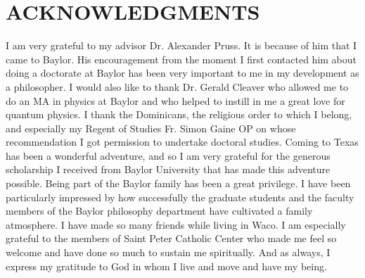 \documentclass[12pt]{report}
\begin{document}

\chapter*{ACKNOWLEDGMENTS} %



I am very grateful to my advisor Dr. Alexander Pruss. It is because of him that I came to Baylor. His encouragement from the moment I first contacted him about doing a doctorate at Baylor has been very important to me in my development as a philosopher. I would also like to thank Dr. Gerald Cleaver who allowed me to do an MA in physics at Baylor and who helped to instill in me a great love for quantum physics. I thank the Dominicans, the religious order to which I belong, and especially my Regent of Studies Fr. Simon Gaine OP on whose recommendation I got permission to undertake doctoral studies. Coming to Texas has been a wonderful adventure, and so I am very grateful for the generous scholarship I received from Baylor University that has made this adventure possible. Being part of the Baylor family has been a great privilege. I have been particularly impressed by how successfully the graduate students and the faculty members of the Baylor philosophy department have cultivated a family atmosphere. I have made so many friends while living in Waco. I am especially grateful to the members of Saint Peter Catholic Center who made me feel so welcome and have done so much to sustain me spiritually. And as always, I express my gratitude to God in whom I live and move and have my being.


\end{document}
